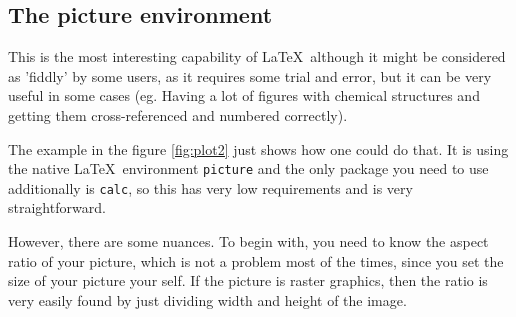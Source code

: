 \subsection{The picture environment}

This is the most interesting capability of \LaTeX\ although it might be
considered as 'fiddly' by some users, as it requires some trial and error, but
it can be very useful in some cases (eg. Having a lot of figures with chemical
structures and getting them cross-referenced and numbered correctly).

The example in the figure \ref{fig:plot2} just shows how one could do that. It
is using the native \LaTeX\ environment \verb|picture| and the only package you
need to use additionally is \verb|calc|, so this has very low requirements and
is very straightforward.




However, there are some nuances. To begin with, you need to know the aspect
ratio of your picture, which is not a problem most of the times, since you set
the size of your picture your self. If the picture is raster graphics, then the
ratio is very easily found by just dividing width and height of the image.

